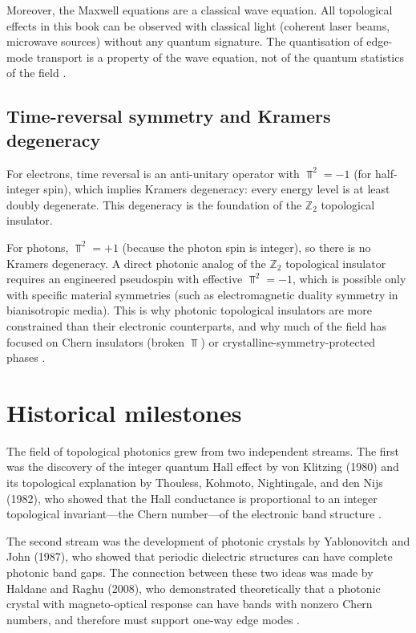 Moreover, the Maxwell equations are a classical wave equation.  All
topological effects in this book can be observed with classical light
(coherent laser beams, microwave sources) without any quantum signature.
The quantisation of edge-mode transport is a property of the wave
equation, not of the quantum statistics of the field
\cite{haldane2008possible,price2022roadmap}.

\subsection{Time-reversal symmetry and Kramers degeneracy}
\label{sec:ch1-TR-kramers}

For electrons, time reversal is an anti-unitary operator with
$\Top^2=-1$ (for half-integer spin), which implies Kramers degeneracy:
every energy level is at least doubly degenerate.  This degeneracy is
the foundation of the $\mathbb{Z}_2$ topological insulator.

For photons, $\Top^2=+1$ (because the photon spin is integer), so
there is no Kramers degeneracy.  A direct photonic analog of the
$\mathbb{Z}_2$ topological insulator requires an engineered pseudospin
with effective $\Top^2=-1$, which is possible only with specific
material symmetries (such as electromagnetic duality symmetry in
bianisotropic media).  This is why photonic topological insulators are
more constrained than their electronic counterparts, and why much of
the field has focused on Chern insulators (broken $\Top$) or
crystalline-symmetry-protected phases
\cite{ozawa2018topological,bliokh2015quantum}.

\section{Historical milestones}
\label{sec:ch1-history}

The field of topological photonics grew from two independent streams.
The first was the discovery of the integer quantum Hall effect by von
Klitzing (1980) and its topological explanation by Thouless,
Kohmoto, Nightingale, and den Nijs (1982), who showed that the Hall
conductance is proportional to an integer topological invariant---the
Chern number---of the electronic band structure
\cite{thouless1982quantized}.

The second stream was the development of photonic crystals by
Yablonovitch and John (1987), who showed that periodic dielectric
structures can have complete photonic band gaps.  The connection
between these two ideas was made by Haldane and Raghu (2008), who
demonstrated theoretically that a photonic crystal with
magneto-optical response can have bands with nonzero Chern numbers,
and therefore must support one-way edge modes
\cite{haldane2008possible}.

